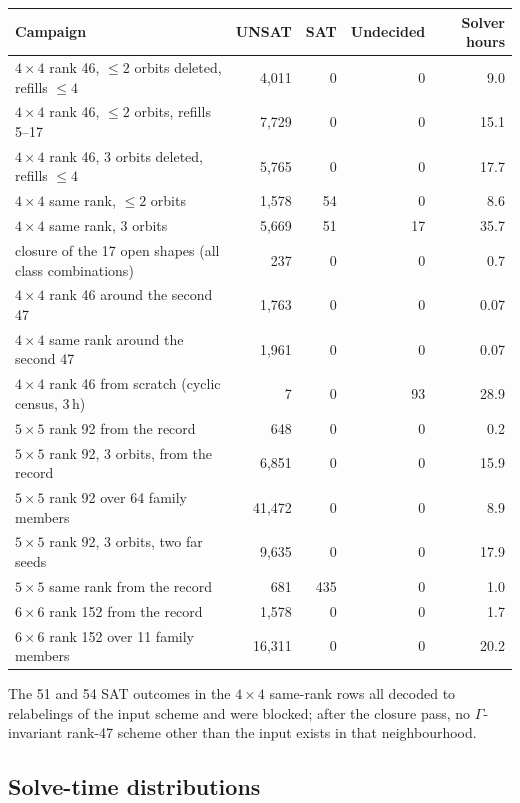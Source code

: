 \documentclass[11pt]{article}
\begin{document}
\begin{center}
\small
\begin{tabular}{lrrrr}
\toprule
Campaign & UNSAT & SAT & Undecided & Solver hours \\
\midrule
$4\times4$ rank 46, $\leq2$ orbits deleted, refills $\leq4$ & 4{,}011 & 0 & 0 & 9.0 \\
$4\times4$ rank 46, $\leq2$ orbits, refills 5--17 & 7{,}729 & 0 & 0 & 15.1 \\
$4\times4$ rank 46, 3 orbits deleted, refills $\leq4$ & 5{,}765 & 0 & 0 & 17.7 \\
$4\times4$ same rank, $\leq2$ orbits & 1{,}578 & 54 & 0 & 8.6 \\
$4\times4$ same rank, 3 orbits & 5{,}669 & 51 & 17 & 35.7 \\
\quad closure of the 17 open shapes (all class combinations) & 237 & 0 & 0 & 0.7 \\
$4\times4$ rank 46 around the second 47 & 1{,}763 & 0 & 0 & 0.07 \\
$4\times4$ same rank around the second 47 & 1{,}961 & 0 & 0 & 0.07 \\
$4\times4$ rank 46 from scratch (cyclic census, 3\,h) & 7 & 0 & 93 & 28.9 \\
$5\times5$ rank 92 from the record & 648 & 0 & 0 & 0.2 \\
$5\times5$ rank 92, 3 orbits, from the record & 6{,}851 & 0 & 0 & 15.9 \\
$5\times5$ rank 92 over 64 family members & 41{,}472 & 0 & 0 & 8.9 \\
$5\times5$ rank 92, 3 orbits, two far seeds & 9{,}635 & 0 & 0 & 17.9 \\
$5\times5$ same rank from the record & 681 & 435 & 0 & 1.0 \\
$6\times6$ rank 152 from the record & 1{,}578 & 0 & 0 & 1.7 \\
$6\times6$ rank 152 over 11 family members & 16{,}311 & 0 & 0 & 20.2 \\
\bottomrule
\end{tabular}
\end{center}

The 51 and 54 SAT outcomes in the $4\times4$ same-rank rows all decoded to relabelings of the input
scheme and were blocked; after the closure pass, no $\Gamma$-invariant rank-47 scheme other than the
input exists in that neighbourhood.

\subsection{Solve-time distributions}
\end{document}
